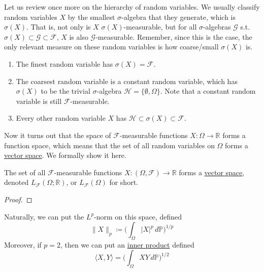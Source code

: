   Let us review once more on the hierarchy of random variables. We usually classify random variables $X$ by the smallest $\sigma$-algebra that they generate, which is $\sigma(X)$. That is, not only is $X$ $\sigma(X)$-measurable, but for all $\sigma$-algebras $\mathcal{G}$ s.t. $\sigma(X) \subset \mathcal{G} \subset \mathcal{F}$, $X$ is also $\mathcal{G}$-measurable. Remember, since this is the case, the only relevant measure on these random variables is how coarse/small $\sigma(X)$ is. 
  \begin{enumerate}
    \item The finest random variable has $\sigma(X) = \mathcal{F}$. 
    
    \item The coarsest random variable is a constant random variable, which has $\sigma(X)$ to be the trivial $\sigma$-algebra $\mathcal{H} = \{\emptyset, \Omega\}$. Note that a constant random variable is still $\mathcal{F}$-measurable. 
    
    \item Every other random variable $X$ has $\mathcal{H} \subset \sigma(X) \subset \mathcal{F}$. 
  \end{enumerate}

  Now it turns out that the space of $\mathcal{F}$-measurable functions $X: \Omega \rightarrow \mathbb{R}$ forms a function space, which means that the set of all random variables on $\Omega$ forms a \hyperref[lin-def:vector-space]{vector space}. We formally show it here. 

  \begin{lemma}
    \label{thm:measurable-functions-form-a-vector-space}
    The set of all $\mathcal{F}$-measurable functions $X: (\Omega, \mathcal{F}) \rightarrow \mathbb{R}$ forms a \hyperref[lin-def:vector-space]{vector space}, denoted $L_\mathcal{F} (\Omega; \mathbb{R})$, or $L_\mathcal{F} (\Omega)$ for short. 
  \end{lemma}
  \begin{proof}

  \end{proof}

  Naturally, we can put the $L^p$-norm on this space, defined 
  \begin{equation}
    \|X\|_p \coloneqq \bigg( \int_\Omega |X|^p \, d\mathbb{P} \bigg)^{1/p}
  \end{equation}
  Moreover, if $p = 2$, then we can put an \hyperref[lin-def:inner-product]{inner product} defined 
  \begin{equation}
    \langle X, Y \rangle = \bigg( \int_\Omega X Y \,d \mathbb{P} \bigg)^{1/2}
  \end{equation}

